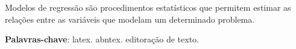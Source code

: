 \setlength{\absparsep}{18pt} %
\begin{resumo}
Modelos de regressão são procedimentos estatísticos que permitem estimar as relações entre as variáveis que modelam um determinado problema.

\textbf{Palavras-chave}: latex. abntex. editoração de texto.
\end{resumo}